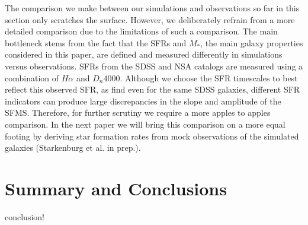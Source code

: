 \documentclass[preprint2,tighten]{aastex62}
\newcommand{\todo}[1]{{\bf \textcolor{red}{ #1}}}
\begin{document}
The comparison we make between our simulations and observations so far in 
this section only scratches the surface. However, we deliberately refrain 
from a more detailed comparison due to the limitations of such a comparison. 
The main bottleneck stems from the fact that the SFRs and $M_*$, the main
galaxy properties considered in this paper, are defined and measured 
differently in simulations versus observations. SFRs from the SDSS and 
NSA catalogs are measured using a combination of $H\alpha$ and $D_n 4000$. 
Although we choose the SFR timescales to best reflect this observed SFR, 
as \cite{speagle2014} find even for the same SDSS galaxies, different SFR 
indicators can produce large discrepancies in the slope and amplitude of 
the SFMS. Therefore, for further scrutiny we require a more apples to apples 
comparison. In the next paper we will bring this comparison on a more equal 
footing by deriving star formation rates from mock observations of the 
simulated galaxies (Starkenburg et al. in prep.).


\section{Summary and Conclusions} \label{sec:summary}
conclusion!
\end{document}
